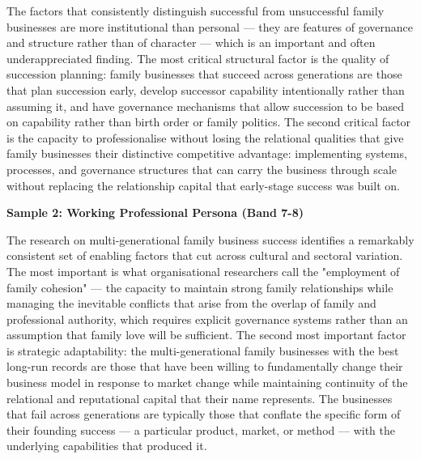 The factors that consistently distinguish successful from unsuccessful family businesses are more institutional than personal — they are features of governance and structure rather than of character — which is an important and often underappreciated finding. The most critical structural factor is the quality of succession planning: family businesses that succeed across generations are those that plan succession early, develop successor capability intentionally rather than assuming it, and have governance mechanisms that allow succession to be based on capability rather than birth order or family politics. The second critical factor is the capacity to professionalise without losing the relational qualities that give family businesses their distinctive competitive advantage: implementing systems, processes, and governance structures that can carry the business through scale without replacing the relationship capital that early-stage success was built on.

\textbf{Sample 2: Working Professional Persona (Band 7-8)}

The research on multi-generational family business success identifies a remarkably consistent set of enabling factors that cut across cultural and sectoral variation. The most important is what organisational researchers call the "employment of family cohesion" — the capacity to maintain strong family relationships while managing the inevitable conflicts that arise from the overlap of family and professional authority, which requires explicit governance systems rather than an assumption that family love will be sufficient. The second most important factor is strategic adaptability: the multi-generational family businesses with the best long-run records are those that have been willing to fundamentally change their business model in response to market change while maintaining continuity of the relational and reputational capital that their name represents. The businesses that fail across generations are typically those that conflate the specific form of their founding success — a particular product, market, or method — with the underlying capabilities that produced it.

\separator


